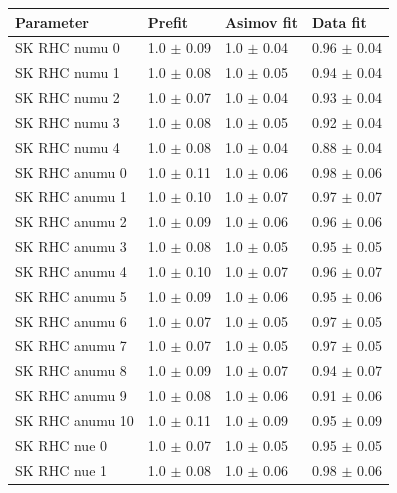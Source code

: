 \begin{table}[ht!]
  \center
  \begin{tabular}{llll}
    \toprule
    Parameter & Prefit & \Gls{Asimov} fit & Data fit \\\midrule

    \Gls{SK} \Gls{RHC} \Gls{numu}  0& 1.0 $\pm$ 0.09 & 1.0 $\pm$ 0.04 & 0.96 $\pm$ 0.04 \\ 
    \Gls{SK} \Gls{RHC} \Gls{numu}  1& 1.0 $\pm$ 0.08 & 1.0 $\pm$ 0.05 & 0.94 $\pm$ 0.04 \\ 
    \Gls{SK} \Gls{RHC} \Gls{numu}  2& 1.0 $\pm$ 0.07 & 1.0 $\pm$ 0.04 & 0.93 $\pm$ 0.04 \\ 
    \Gls{SK} \Gls{RHC} \Gls{numu}  3& 1.0 $\pm$ 0.08 & 1.0 $\pm$ 0.05 & 0.92 $\pm$ 0.04 \\ 
    \Gls{SK} \Gls{RHC} \Gls{numu}  4& 1.0 $\pm$ 0.08 & 1.0 $\pm$ 0.04 & 0.88 $\pm$ 0.04 \\ 
    \Gls{SK} \Gls{RHC} \Gls{anumu} 0& 1.0 $\pm$ 0.11 & 1.0 $\pm$ 0.06 & 0.98 $\pm$ 0.06 \\ 
    \Gls{SK} \Gls{RHC} \Gls{anumu} 1& 1.0 $\pm$ 0.10 & 1.0 $\pm$ 0.07 & 0.97 $\pm$ 0.07 \\ 
    \Gls{SK} \Gls{RHC} \Gls{anumu} 2& 1.0 $\pm$ 0.09 & 1.0 $\pm$ 0.06 & 0.96 $\pm$ 0.06 \\ 
    \Gls{SK} \Gls{RHC} \Gls{anumu} 3& 1.0 $\pm$ 0.08 & 1.0 $\pm$ 0.05 & 0.95 $\pm$ 0.05 \\ 
    \Gls{SK} \Gls{RHC} \Gls{anumu} 4& 1.0 $\pm$ 0.10 & 1.0 $\pm$ 0.07 & 0.96 $\pm$ 0.07 \\ 
    \Gls{SK} \Gls{RHC} \Gls{anumu} 5& 1.0 $\pm$ 0.09 & 1.0 $\pm$ 0.06 & 0.95 $\pm$ 0.06 \\ 
    \Gls{SK} \Gls{RHC} \Gls{anumu} 6& 1.0 $\pm$ 0.07 & 1.0 $\pm$ 0.05 & 0.97 $\pm$ 0.05 \\ 
    \Gls{SK} \Gls{RHC} \Gls{anumu} 7& 1.0 $\pm$ 0.07 & 1.0 $\pm$ 0.05 & 0.97 $\pm$ 0.05 \\ 
    \Gls{SK} \Gls{RHC} \Gls{anumu} 8& 1.0 $\pm$ 0.09 & 1.0 $\pm$ 0.07 & 0.94 $\pm$ 0.07 \\ 
    \Gls{SK} \Gls{RHC} \Gls{anumu} 9& 1.0 $\pm$ 0.08 & 1.0 $\pm$ 0.06 & 0.91 $\pm$ 0.06 \\ 
    \Gls{SK} \Gls{RHC} \Gls{anumu} 10& 1.0 $\pm$ 0.11 & 1.0 $\pm$ 0.09 & 0.95 $\pm$ 0.09 \\ 
    \Gls{SK} \Gls{RHC} \Gls{nue}  0& 1.0 $\pm$ 0.07 & 1.0 $\pm$ 0.05 & 0.95 $\pm$ 0.05 \\ 
    \Gls{SK} \Gls{RHC} \Gls{nue}  1& 1.0 $\pm$ 0.08 & 1.0 $\pm$ 0.06 & 0.98 $\pm$ 0.06 \\ 

\end{tabular}
\end{table}

